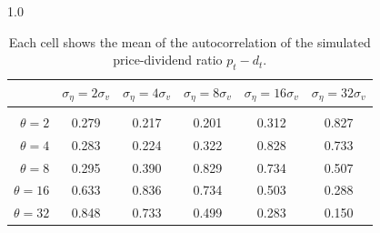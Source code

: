 \documentclass[12pt]{article}
\begin{document}
\begin{table}[h!]
\vspace{10pt}
\begin{subtable}{1.0\textwidth}
    \centering
\begin{tabular}{rccccc}
\hline  
            & \multicolumn{1}{l}{$\sigma_{\eta} =2\sigma_{v}$} & \multicolumn{1}{l}{$\sigma_{\eta} =4\sigma_{v}$} & \multicolumn{1}{l}{$\sigma_{\eta} =8\sigma_{v}$} & \multicolumn{1}{l}{$\sigma_{\eta} =16\sigma_{v}$} & \multicolumn{1}{l}{$\sigma_{\eta} =32\sigma_{v}$} \\ \hline  \vspace{-3mm} \\        
$\theta=2$  & 0.279                                             & 0.217                                             & 0.201                                             & 0.312                                              & 0.827                                              \\ \hline
$\theta=4$  & 0.283                                             & 0.224                                             & 0.322                                             & 0.828                                              & 0.733                                              \\ \hline
$\theta=8$  & 0.295                                             & 0.390                                             & 0.829                                             & 0.734                                              & 0.507                                              \\ \hline
$\theta=16$ & 0.633                                             & 0.836                                             & 0.734                                             & 0.503                                              & 0.288                                              \\ \hline
$\theta=32$ & 0.848                                             & 0.733                                             & 0.499                                             & 0.283                                              & 0.150                                              \\ \hline
\end{tabular}
\end{subtable}

\caption{Each cell shows the mean of the autocorrelation of the simulated price-dividend ratio $p_{t}-d_{t}$.}
\label{tabacsamps}
\end{table}
\pagebreak
\end{document}
